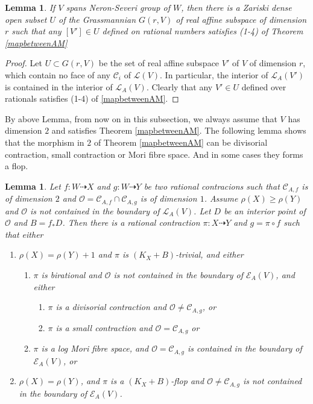 \documentclass[11pt]{amsart}
\numberwithin{equation}{section}
\newtheorem{lem}[defn]{Lemma}
\begin{document}
\begin{lem}\label{subspace}
  \cite[Corollary 3.4]{haconSarkisovProgram2012}If $V$ spans  Neron-Severi group of $W$, then there is a Zariski dense open subset $U$ of the Grassmannian $G(r,V)$ of real affine subspace of dimension $r$ such that any  $[V']\in U$ defined on rational numbers satisfies (1-4) of Theorem \ref{mapbetweenAM} 
\end{lem}
\begin{proof}
 Let $U \subset G(r,V) $ be the set of real affine subspace  $V'$ of $V$ of dimension $r$, which contain no face of any $\mathcal{C}_{i}$ of $\mathcal{L}(V)$. In particular, the interior of  $\mathcal{L}_{A}(V')$ is contained in the interior of $\mathcal{L}_{A}(V)$. Clearly that any $V'\in U$ defined over rationals satisfies (1-4) of \ref{mapbetweenAM}. 
\end{proof}
By above Lemma, from now on in this subsection, we always assume that $V$ has dimension $2$ and satisfies Theorem \ref{mapbetweenAM}. The following lemma shows that the morphism in $2$ of Theorem \ref{mapbetweenAM} can be divisorial contraction, small contraction or Mori fibre space. And in some cases they forms a flop.
\begin{lem}\label{mapbetweenAM2}
\cite[Lemma 3.5]{haconSarkisovProgram2012} Let $ f:W\dashrightarrow X $ and $ g:W\dashrightarrow  Y $ be two rational contracions such that $ \mathcal{C}_{A,f} $ is of dimension $ 2 $ and $ \mathcal{O}=\mathcal{C}_{A,f}\cap \mathcal{C}_{A,g} $ is of dimension $ 1 $. Assume $ \rho(X)\geqslant \rho(Y) $ and $ \mathcal{O} $ is not contained in the boundary of $ \mathcal{L}_{A}(V) $. Let $ D $ be an interior point of $ \mathcal{O} $ and $ B=f_*D $. Then there is a rational contraction $ \pi:X\dashrightarrow Y $ and $ g=\pi\circ f $ such that either
\begin{enumerate}
  \item $ \rho(X)=\rho(Y)+1 $ and $ \pi  $ is $ (K_X+B) $-trivial, and either
  \begin{enumerate}
    \item $ \pi $ is birational and $ \mathcal{O} $ is not contained in the boundary of $ \mathcal{E}_A(V) $, and either
    \begin{enumerate}
      \item $ \pi $ is a divisorial contraction and $ \mathcal{O}\neq \mathcal{C}_{A,g} $, or
      \item $ \pi $ is a small contraction and $ \mathcal{O}= \mathcal{C}_{A,g} $ or
    \end{enumerate}
    \item $ \pi $ is a log Mori fibre space, and $ \mathcal{O}=\mathcal{C}_{A,g} $ is contained in the boundary of $ \mathcal{E}_{A}(V) $, or
  \end{enumerate}
  \item $ \rho(X)=\rho(Y) $, and $ \pi $ is  a $ (K_X+B) $-flop and $ \mathcal{O}\neq\mathcal{C}_{A,g} $ is not contained in the boundary of $ \mathcal{E}_A(V) $.
  \end{enumerate}
\end{lem}
\end{document}
